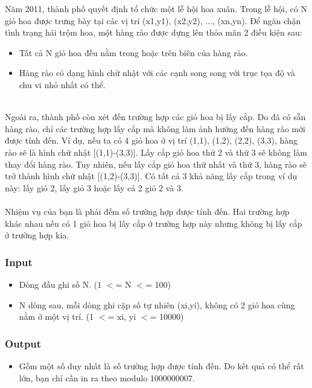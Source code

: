 



   Năm 2011, thành phố quyết định tổ chức một lễ hội hoa xuân. Trong lễ hội, có N giỏ hoa được trưng bày tại các vị trí (x1,y1), (x2,y2), ..., (xn,yn). Để ngăn chặn tình trạng hái trộm hoa, một hàng rào được dựng lên thỏa mãn 2 điều kiện sau:  
\begin{itemize}
	\item     Tất cả N giỏ hoa đều nằm trong hoặc trên biên của hàng rào.   
\end{itemize}
\begin{itemize}
	\item     Hàng rào có dạng hình chữ nhật với các cạnh song song với trục tọa độ và chu vi nhỏ nhất có thể.   
\end{itemize}


\\   Ngoài ra, thành phố còn xét đến trường hợp các giỏ hoa bị lấy cắp. Do đã có sẵn hàng rào, chỉ các trường hợp lấy cắp mà không làm ảnh hưởng đến hàng rào mới được tính đến. Ví dụ, nếu ta có 4 giỏ hoa ở vị trí (1,1), (1,2), (2,2), (3,3), hàng rào sẽ là hình chữ nhật [(1,1)-(3,3)]. Lấy cắp giỏ hoa thứ 2 và thứ 3 sẽ không làm thay đổi hàng rào. Tuy nhiên, nếu lấy cắp giỏ hoa thứ nhất và thứ 3, hàng rào sẽ trở thành hình chữ nhật [(1,2)-(3,3)]. Có tất cả 3 khả năng lấy cắp trong ví dụ này: lấy giỏ 2, lấy giỏ 3 hoặc lấy cả 2 giỏ 2 và 3.   
\\
\\   Nhiệm vụ của bạn là phải đếm số trường hợp được tính đến. Hai trường hợp khác nhau nếu có 1 giỏ hoa bị lấy cắp ở trường hợp này nhưng không bị lấy cắp ở trường hợp kia.  

\subsubsection{   Input  }
\begin{itemize}
	\item     Dòng đầu ghi số N. (1 $<$= N $<$= 100)   
\end{itemize}
\begin{itemize}
	\item     N dòng sau, mỗi dòng ghi cặp số tự nhiên (xi,yi), không có 2 giỏ hoa cùng nằm ở một vị trí. (1 $<$= xi, yi $<$= 10000)   
\end{itemize}

\subsubsection{   Output  }
\begin{itemize}
	\item     Gồm một số duy nhất là số trường hợp được tính đến. Do kết quả có thể rất lớn, bạn chỉ cần in ra theo modulo 1000000007.   
\end{itemize}

